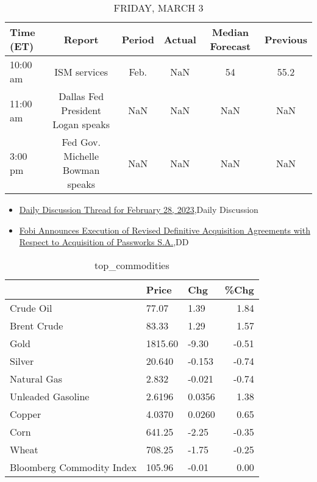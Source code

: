 \documentclass{article}%
\begin{document}
%


\begin{table}[htbp]%
\caption{FRIDAY, MARCH 3}%
\centering%
\begin{adjustbox}{width=1\textwidth}%
\begin{tabular}{lccccc}
\toprule
Time (ET) &                            Report & Period & Actual & Median Forecast & Previous \\
\midrule
 10:00 am &                      ISM services &   Feb. &    NaN &              54 &     55.2 \\
 11:00 am & Dallas Fed President Logan speaks &    NaN &    NaN &             NaN &      NaN \\
  3:00 pm &   Fed Gov. Michelle Bowman speaks &    NaN &    NaN &             NaN &      NaN \\
\bottomrule
\end{tabular}
%
\end{adjustbox}%
\end{table}

%
\begin{itemize}%
\item%
\href{https://reddit.com/r/wallstreetbets/comments/11e3ac2/daily\_discussion\_thread\_for\_february\_28\_2023/}{Daily Discussion Thread for February 28, 2023},Daily Discussion%
\item%
\href{https://reddit.com/r/Baystreetbets/comments/11deftr/fobi\_announces\_execution\_of\_revised\_definitive/}{Fobi Announces Execution of Revised Definitive Acquisition Agreements with Respect to Acquisition of Passworks S.A.},DD%
\end{itemize}%


\begin{table}[htbp]%
\caption{top\_commodities}%
\centering%
\begin{adjustbox}{width=1\textwidth}%
\begin{tabular}{lllr}
\toprule
                          &   Price &    Chg &  \%Chg \\
\midrule
               Crude Oil  &   77.07 &   1.39 &  1.84 \\
             Brent Crude  &   83.33 &   1.29 &  1.57 \\
                    Gold  & 1815.60 &  -9.30 & -0.51 \\
                  Silver  &  20.640 & -0.153 & -0.74 \\
             Natural Gas  &   2.832 & -0.021 & -0.74 \\
       Unleaded Gasoline  &  2.6196 & 0.0356 &  1.38 \\
                  Copper  &  4.0370 & 0.0260 &  0.65 \\
                    Corn  &  641.25 &  -2.25 & -0.35 \\
                   Wheat  &  708.25 &  -1.75 & -0.25 \\
Bloomberg Commodity Index &  105.96 &  -0.01 &  0.00 \\
\bottomrule
\end{tabular}
%
\end{adjustbox}%
\end{table}
\end{document}
